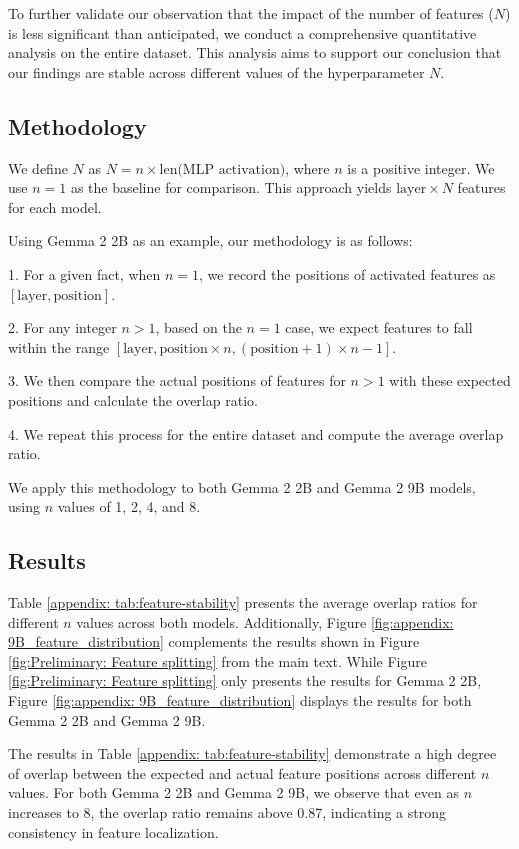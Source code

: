To further validate our observation that the impact of the number of features ($N$) is less significant than anticipated, we conduct a comprehensive quantitative analysis on the entire dataset. This analysis aims to support our conclusion that our findings are stable across different values of the hyperparameter $N$.

\subsection{Methodology}

We define $N$ as $N = n \times \text{len(MLP activation)}$, where $n$ is a positive integer. We use $n = 1$ as the baseline for comparison. This approach yields $\text{layer} \times N$ features for each model.

Using Gemma 2 2B as an example, our methodology is as follows:

1. For a given fact, when $n = 1$, we record the positions of activated features as $[\text{layer}, \text{position}]$.

2. For any integer $n > 1$, based on the $n = 1$ case, we expect features to fall within the range $[\text{layer}, \text{position} \times n, (\text{position} + 1) \times n - 1]$.

3. We then compare the actual positions of features for $n > 1$ with these expected positions and calculate the overlap ratio.

4. We repeat this process for the entire dataset and compute the average overlap ratio.

We apply this methodology to both Gemma 2 2B and Gemma 2 9B models, using $n$ values of 1, 2, 4, and 8.

\subsection{Results}
Table \ref{appendix: tab:feature-stability} presents the average overlap ratios for different $n$ values across both models. Additionally, Figure \ref{fig:appendix: 9B_feature_distribution} complements the results shown in Figure \ref{fig:Preliminary: Feature splitting} from the main text. While Figure \ref{fig:Preliminary: Feature splitting} only presents the results for Gemma 2 2B, Figure \ref{fig:appendix: 9B_feature_distribution} displays the results for both Gemma 2 2B and Gemma 2 9B.


The results in Table \ref{appendix: tab:feature-stability} demonstrate a high degree of overlap between the expected and actual feature positions across different $n$ values. For both Gemma 2 2B and Gemma 2 9B, we observe that even as $n$ increases to 8, the overlap ratio remains above 0.87, indicating a strong consistency in feature localization.

